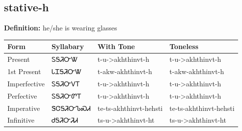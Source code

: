 \documentclass{article}%
\begin{document}
\subsection*{stative-h}%
\textbf{Definition: }%
he/she is wearing glasses%
\\[0.5em]%
\begin{tabular}{|l|l|l|l|}%
\hline%
\textbf{Form}&\textbf{Syllabary}&\textbf{With Tone}&\textbf{Toneless}\\%
\hline%
Present&ᏚᎦᏘᏅᏔ&t{-}u{-}>akhthinvt{-}h&t{-}u{-}>akhthinvt{-}h\\%
1st Present&ᏓᏆᎦᏘᏅᏔ&t{-}akw{-}akhthinvt{-}h&t{-}akw{-}akhthinvt{-}h\\%
Imperfective&ᏚᎦᏘᏅᏙᎢ&t{-}u{-}>akhthinvt{-}h&t{-}u{-}>akhthinvt{-}h\\%
Perfective&ᏚᎦᏘᏅᏛᎢ&t{-}u{-}>akhthinvt{-}h&t{-}u{-}>akhthinvt{-}h\\%
Imperative&ᏕᏣᎦᏘᏅᏖᏍᏗ&te{-}ts{-}akhthinvt{-}hehsti&te{-}ts{-}akhthinvt{-}hehsti\\%
Infinitive&ᏧᎦᏘᏅᏘᏗ&ts{-}u{-}>akhthinvt{-}ht&ts{-}u{-}>akhthinvt{-}ht\\%
\hline%
\end{tabular}%
\\[1em]%
\end{document}
